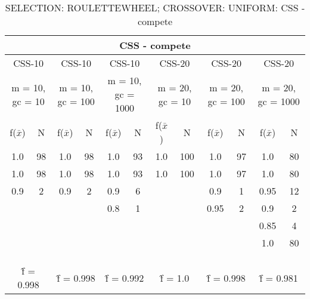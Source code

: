 \begin{table}[H]
	\centering
	\caption{SELECTION: ROULETTEWHEEL; CROSSOVER: UNIFORM: CSS - compete}
	\begin{adjustbox}{width=1\textwidth}
		\begin{tabular}{ |c|c||c|c||c|c||c|c||c|c||c|c| }
			\hline
			\multicolumn{12}{|c|}{CSS - compete} \\
			\hline
			\multicolumn{2}{|c||}{CSS-10} & \multicolumn{2}{c||}{CSS-10} & \multicolumn{2}{c||}{CSS-10} & \multicolumn{2}{c||}{CSS-20} & \multicolumn{2}{c||}{CSS-20} & \multicolumn{2}{c|}{CSS-20}\\
			\hline
			\multicolumn{2}{|c||}{m = 10, gc = 10} & \multicolumn{2}{c||}{m = 10, gc = 100} & \multicolumn{2}{c||}{m = 10, gc = 1000} & \multicolumn{2}{c||}{m = 20, gc = 10} & \multicolumn{2}{c||}{m = 20, gc = 100} & \multicolumn{2}{c|}{m = 20, gc = 1000}\\
			\hline
			f($\bar{x}$) & N & f($\bar{x}$) & N & f($\bar{x}$) & N & f($\bar{x}$) & N & f($\bar{x}$) & N & f($\bar{x}$) & N\\
			\hline
			\hline
			1.0 & 98 & 1.0 & 98 & 1.0 & 93 & 1.0 & 100 & 1.0 & 97 & 1.0 & 80\\
			\hline
			1.0 & 98 & 1.0 & 98 & 1.0 & 93 & 1.0 & 100 & 1.0 & 97 & 1.0 & 80\\
			0.9 & 2 & 0.9 & 2 & 0.9 & 6 &   &   & 0.9 & 1 & 0.95 & 12\\
			&   &   &   & 0.8 & 1 &   &   & 0.95 & 2 & 0.9 & 2\\
			&   &   &   &   &   &   &   &   &   & 0.85 & 4\\
			&   &   &   &   &   &   &   &   &   & 1.0 & 80\\
			&   &   &   &   &   &   &   &   &   &   &  \\
			&   &   &   &   &   &   &   &   &   &   &  \\
			&   &   &   &   &   &   &   &   &   &   &  \\
			\hline
			\multicolumn{2}{|c||}{\^{f} = 0.998} & \multicolumn{2}{c||}{\^{f} = 0.998} & \multicolumn{2}{c||}{\^{f} = 0.992} & \multicolumn{2}{c||}{\^{f} = 1.0} & \multicolumn{2}{c||}{\^{f} = 0.998} & \multicolumn{2}{c|}{\^{f} = 0.981}\\
			\hline
		\end{tabular}
	\end{adjustbox}
\end{table}

